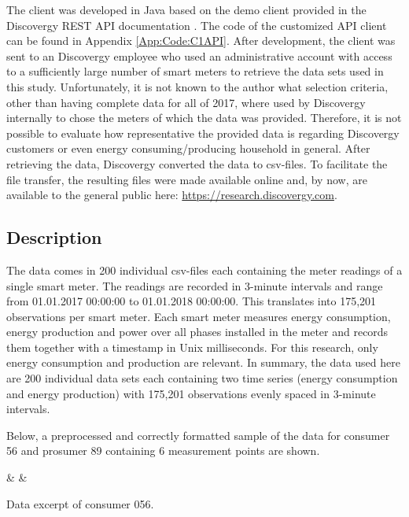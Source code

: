 The client was developed in Java based on the demo client provided in the Discovergy REST API documentation \citep{DiscovergyAPI:2018}. The code of the customized API client can be found in Appendix \ref{App:Code:C1API}. After development, the client was sent to an Discovergy employee who used an administrative account with access to a sufficiently large number of smart meters to retrieve the data sets used in this study. Unfortunately, it is not known to the author what selection criteria, other than having complete data for all of 2017, where used by Discovergy internally to chose the meters of which the data was provided. Therefore, it is not possible to evaluate how representative the provided data is regarding Discovergy customers or even energy consuming/producing household in general.
After retrieving the data, Discovergy converted the data to csv-files. To facilitate the file transfer, the resulting files were made available online and, by now, are available to the general public here: \href{https://research.discovergy.com}{https://research.discovergy.com}. 




\subsection{Description}\label{Sec:Data;Subsec:Description}

The data comes in 200 individual csv-files each containing the meter readings of a single smart meter. The readings are recorded in 3-minute intervals and range from 01.01.2017 00:00:00 to 01.01.2018 00:00:00. This translates into 175,201 observations per smart meter. Each smart meter measures energy consumption, energy production and power over all phases installed in the meter and records them together with a timestamp in Unix milliseconds. For this research, only energy consumption and production are relevant. In summary, the data used here are 200 individual data sets each containing two time series (energy consumption and energy production) with 175,201 observations evenly spaced in 3-minute intervals.

Below, a preprocessed and correctly formatted sample of the data for consumer 56 and prosumer 89 containing 6 measurement points are shown.

\begin{table}[htbp]
    {\csvcolii & \csvcoliii & \csvcoliv}%
    \caption[Data excerpt of consumer 056]{Data excerpt of consumer 056. \quantnet}
    \label{Tab:c056}
\end{table}

